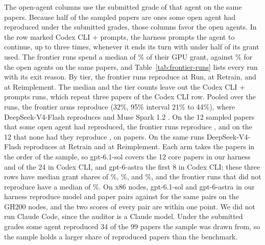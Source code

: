 The open-agent columns use the submitted grade of that agent on the same
papers. Because half of the sampled papers are ones some open agent had
reproduced under the submitted grades, those columns favor the open agents. In the row marked Codex CLI + prompts, the harness prompts the agent to continue, up to three times, whenever it ends its turn with under half of its grant used. The frontier runs
spend a median of \% of their GPU grant, against \% for
the open agents on the same papers, and Table~\ref{tab:frontier-runs} lists
every run with its exit reason. By tier, the frontier runs reproduce  at Run,  at Retrain, and  at Reimplement. The median and the tier counts leave out the Codex CLI + prompts runs, which repeat three papers of the Codex CLI row. Pooled over the  runs, the frontier arms reproduce  (32\%, 95\% interval 21\% to 44\%), where DeepSeek-V4-Flash reproduces  and Muse Spark 1.2 . On the 12 sampled papers that some open agent had reproduced, the frontier runs reproduce , and on the 12 that none had they reproduce , on  papers. On the same runs DeepSeek-V4-Flash reproduces  at Retrain and  at Reimplement. Each arm takes the papers in the order of the sample, so gpt-6.1-sol covers the 12 core papers in our harness and  of the 24 in Codex CLI, and gpt-6-astra the first 8 in Codex CLI; these three rows have median grant shares of \%, \%, and \%, and the frontier runs that did not reproduce have a median of \%. On x86 nodes, gpt-6.1-sol and gpt-6-astra in our harness reproduce  model and paper pairs against  for the same pairs on the GH200 nodes, and the two scores of every pair are within one point.
We did not run Claude Code, since the auditor
is a Claude model. Under the submitted grades some agent reproduced 34 of the 99 papers the sample was drawn from, so the sample holds a larger share of reproduced papers than the benchmark.



\FloatBarrier  %
